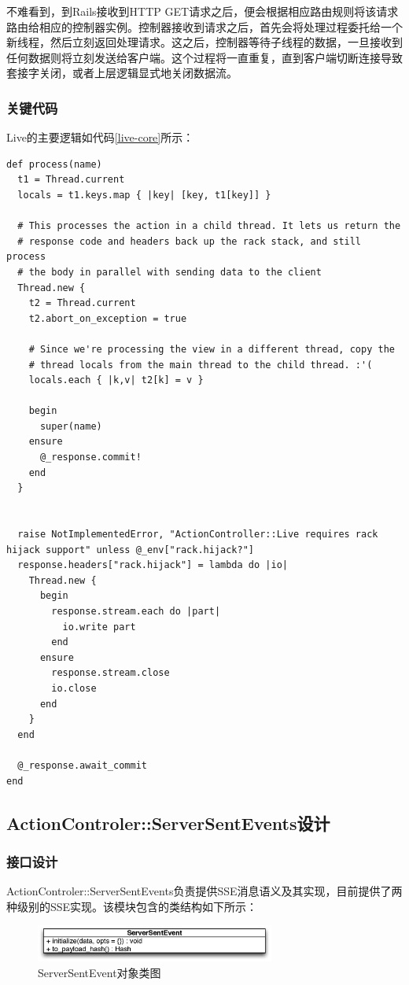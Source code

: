 不难看到，到Rails接收到HTTP GET请求之后，便会根据相应路由规则将该请求路由给相应的控制器实例。控制器接收到请求之后，首先会将处理过程委托给一个新线程，然后立刻返回处理请求。这之后，控制器等待子线程的数据，一旦接收到任何数据则将立刻发送给客户端。这个过程将一直重复，直到客户端切断连接导致套接字关闭，或者上层逻辑显式地关闭数据流。



\subsubsection{关键代码}
Live的主要逻辑如代码\ref{live-core}所示：
\begin{lstlisting}[caption={Live核心代码展示}, label=live-core]
def process(name)
  t1 = Thread.current
  locals = t1.keys.map { |key| [key, t1[key]] }

  # This processes the action in a child thread. It lets us return the
  # response code and headers back up the rack stack, and still process
  # the body in parallel with sending data to the client
  Thread.new {
    t2 = Thread.current
    t2.abort_on_exception = true

    # Since we're processing the view in a different thread, copy the
    # thread locals from the main thread to the child thread. :'(
    locals.each { |k,v| t2[k] = v }

    begin
      super(name)
    ensure
      @_response.commit!
    end
  }


  raise NotImplementedError, "ActionController::Live requires rack hijack support" unless @_env["rack.hijack?"]
  response.headers["rack.hijack"] = lambda do |io|
    Thread.new {
      begin
        response.stream.each do |part|
          io.write part
        end
      ensure
        response.stream.close
        io.close
      end
    }
  end

  @_response.await_commit
end
\end{lstlisting}

\subsection{ActionControler::ServerSentEvents设计}
\subsubsection{接口设计}
ActionControler::ServerSentEvents负责提供SSE消息语义及其实现，目前提供了两种级别的SSE实现。该模块包含的类结构如下所示：

\begin{figure}[h]
\centering
\includegraphics[width=0.7\textwidth]{images/detail/sse_class.eps}
\caption{ServerSentEvent对象类图}
\label{fig-sse-class}
\end{figure}


